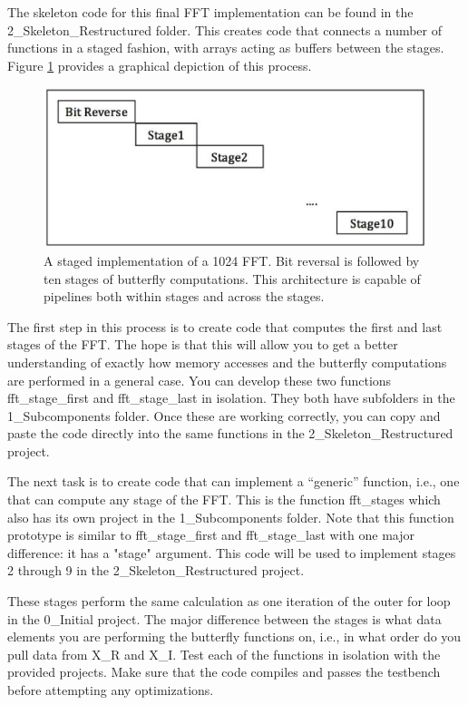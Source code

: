 \documentclass[a4paper,12pt,twoside]{article}
\begin{document}
The skeleton code for this final FFT implementation can be found in the 2\_Skeleton\_Restructured folder. This creates code that connects a number of functions in a staged fashion, with arrays acting as buffers between the stages. Figure \ref{FFFT} provides a graphical depiction of this process.
\begin{figure}[H]
    \centering
    \includegraphics[width=\textwidth]{images/9.png}
    \caption{A staged implementation of a 1024 FFT. Bit reversal is followed by ten stages of butterfly computations. This architecture is capable of pipelines both within stages and across the stages.}
    \label{FFFT}
\end{figure}
The first step in this process is to create code that computes the first and last stages of the FFT. The hope is that this will allow you to get a better understanding of exactly how memory accesses and the butterfly computations are performed in a general case. You can develop these two functions fft\_stage\_first and fft\_stage\_last in isolation. They both have subfolders in the 1\_Subcomponents folder. Once these are working correctly, you can copy and paste the code directly into the same functions in the 2\_Skeleton\_Restructured project.

The next task is to create code that can implement a “generic” function, i.e., one that can compute any stage of the FFT. This is the function fft\_stages which also has its own project in the 1\_Subcomponents folder. Note that this function prototype is similar to fft\_stage\_first and fft\_stage\_last with one major difference: it has a "stage" argument. This code will be used to implement stages 2 through 9 in the 2\_Skeleton\_Restructured project.

These stages perform the same calculation as one iteration of the outer for loop in the 0\_Initial project. The major difference between the stages is what data elements you are performing the butterfly functions on, i.e., in what order do you pull data from X\_R and X\_I. Test each of the functions in isolation with the provided projects. Make sure that the code compiles and passes the testbench before attempting any optimizations.
\end{document}
